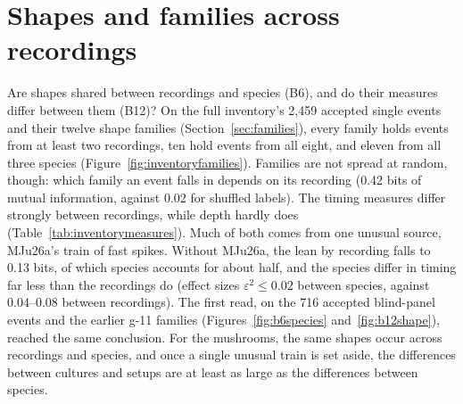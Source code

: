 \section{Shapes and families across recordings}
\label{sec:rb_families}

Are shapes shared between recordings and species (B6), and do their measures differ between them (B12)? On the full inventory's 2,459 accepted single events and their twelve shape families (Section~\ref{sec:families}), every family holds events from at least two recordings, ten hold events from all eight, and eleven from all three species (Figure~\ref{fig:inventoryfamilies}). Families are not spread at random, though: which family an event falls in depends on its recording (0.42 bits of mutual information, against 0.02 for shuffled labels). The timing measures differ strongly between recordings, while depth hardly does (Table~\ref{tab:inventorymeasures}). Much of both comes from one unusual source, MJu26a's train of fast spikes. Without MJu26a, the lean by recording falls to 0.13 bits, of which species accounts for about half, and the species differ in timing far less than the recordings do (effect sizes $\varepsilon^2\le0.02$ between species, against 0.04--0.08 between recordings). The first read, on the 716 accepted blind-panel events and the earlier g-11 families (Figures~\ref{fig:b6species} and~\ref{fig:b12shape}), reached the same conclusion. For the mushrooms, the same shapes occur across recordings and species, and once a single unusual train is set aside, the differences between cultures and setups are at least as large as the differences between species.

